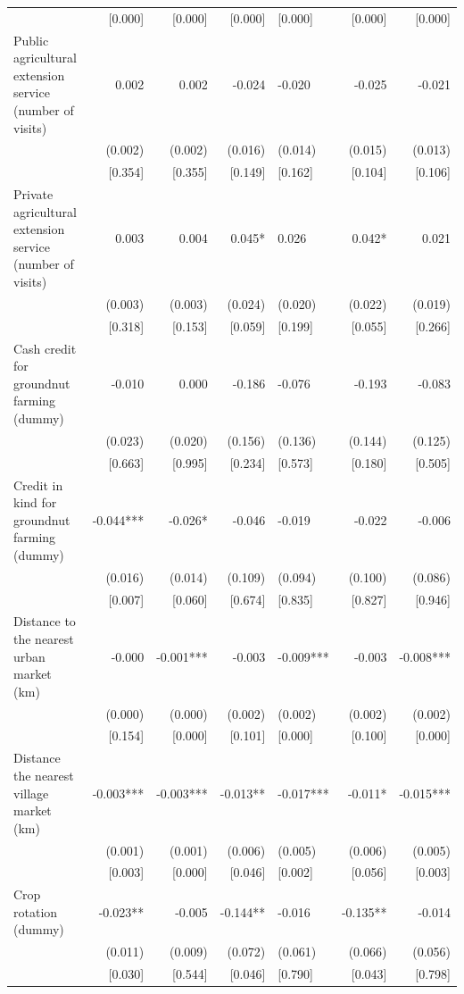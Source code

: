 \documentclass[
]{article}
\begin{document}
\begin{ThreePartTable}
\begin{longtable}[t]{lrrrlrr}
 & {}[0.000] & {}[0.000] & {}[0.000] & {}[0.000] & {}[0.000] & {}[0.000]\\
Public agricultural extension service (number of visits) & 0.002 & 0.002 & -0.024 & -0.020 & -0.025 & -0.021\\
 & (0.002) & (0.002) & (0.016) & (0.014) & (0.015) & (0.013)\\
 & {}[0.354] & {}[0.355] & {}[0.149] & {}[0.162] & {}[0.104] & {}[0.106]\\
Private agricultural extension service (number of visits) & 0.003 & 0.004 & 0.045* & 0.026 & 0.042* & 0.021\\
 & (0.003) & (0.003) & (0.024) & (0.020) & (0.022) & (0.019)\\
 & {}[0.318] & {}[0.153] & {}[0.059] & {}[0.199] & {}[0.055] & {}[0.266]\\
Cash credit for groundnut farming (dummy) & -0.010 & 0.000 & -0.186 & -0.076 & -0.193 & -0.083\\
 & (0.023) & (0.020) & (0.156) & (0.136) & (0.144) & (0.125)\\
 & {}[0.663] & {}[0.995] & {}[0.234] & {}[0.573] & {}[0.180] & {}[0.505]\\
Credit in kind for groundnut farming (dummy) & -0.044*** & -0.026* & -0.046 & -0.019 & -0.022 & -0.006\\
 & (0.016) & (0.014) & (0.109) & (0.094) & (0.100) & (0.086)\\
 & {}[0.007] & {}[0.060] & {}[0.674] & {}[0.835] & {}[0.827] & {}[0.946]\\
Distance to the nearest urban market (km) & -0.000 & -0.001*** & -0.003 & -0.009*** & -0.003 & -0.008***\\
 & (0.000) & (0.000) & (0.002) & (0.002) & (0.002) & (0.002)\\
 & {}[0.154] & {}[0.000] & {}[0.101] & {}[0.000] & {}[0.100] & {}[0.000]\\
Distance the nearest village market (km) & -0.003*** & -0.003*** & -0.013** & -0.017*** & -0.011* & -0.015***\\
 & (0.001) & (0.001) & (0.006) & (0.005) & (0.006) & (0.005)\\
 & {}[0.003] & {}[0.000] & {}[0.046] & {}[0.002] & {}[0.056] & {}[0.003]\\
Crop rotation (dummy) & -0.023** & -0.005 & -0.144** & -0.016 & -0.135** & -0.014\\
 & (0.011) & (0.009) & (0.072) & (0.061) & (0.066) & (0.056)\\
 & {}[0.030] & {}[0.544] & {}[0.046] & {}[0.790] & {}[0.043] & {}[0.798]\\

\end{longtable}
\end{ThreePartTable}
\end{document}
